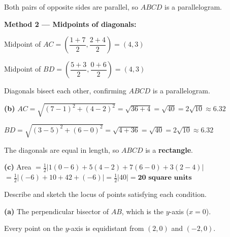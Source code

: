 \documentclass[addpoints]{exam}
\begin{document}
\begin{questions}
\begin{solution}[11cm]
Both pairs of opposite sides are parallel, so $ABCD$ is a parallelogram.

\textbf{Method 2 — Midpoints of diagonals:}

Midpoint of $AC = \left(\dfrac{1+7}{2}, \dfrac{2+4}{2}\right) = (4, 3)$

Midpoint of $BD = \left(\dfrac{5+3}{2}, \dfrac{0+6}{2}\right) = (4, 3)$ \checkmark

Diagonals bisect each other, confirming $ABCD$ is a parallelogram.

\textbf{(b)} $AC = \sqrt{(7-1)^2+(4-2)^2} = \sqrt{36+4} = \sqrt{40} = 2\sqrt{10} \approx 6.32$

$BD = \sqrt{(3-5)^2+(6-0)^2} = \sqrt{4+36} = \sqrt{40} = 2\sqrt{10} \approx 6.32$

The diagonals are equal in length, so $ABCD$ is a \textbf{rectangle}.

\textbf{(c)} Area $= \tfrac{1}{2}|1(0-6) + 5(4-2) + 7(6-0) + 3(2-4)|$
$= \tfrac{1}{2}|(-6) + 10 + 42 + (-6)| = \tfrac{1}{2}|40| = \mathbf{20 \text{ square units}}$
\end{solution}

\question[8] Describe and sketch the locus of points satisfying each condition.
\begin{solution}[10cm]
\textbf{(a)} The perpendicular bisector of $AB$, which is the $y$-axis ($x = 0$).

Every point on the $y$-axis is equidistant from $(2,0)$ and $(-2,0)$.


\end{solution}
\end{questions}
\end{document}
